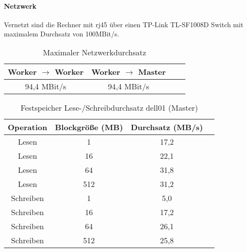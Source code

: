 \paragraph{Netzwerk}
Vernetzt sind die Rechner mit \gls{rj45} über einen TP-Link TL-SF1008D Switch mit maximalem Durchsatz von 100MBit/s.

\begin{table}[ht]
	\centering %
	\begin{tabular}{c c c c} %
	\hline\hline %
	Worker $\rightarrow$ Worker & Worker $\rightarrow$ Master \\ [0.5ex] %
	\hline %
	94,4 MBit/s & 94,4 MBit/s\\ [1ex] 
	\hline %
	\end{tabular}
	\caption{Maximaler Netzwerkdurchsatz{\protect\footnotemark}} %
	\label{table:network} %
\end{table}

\begin{table}[ht]
	\centering %
	\begin{tabular}{c c c c} %
	\hline\hline %
	Operation & Blockgröße (MB) & Durchsatz (MB/s) \\ [0.5ex] %
	\hline %
	Lesen & 1 & 17,2 \\ 
	Lesen & 16 & 22,1 \\
	Lesen & 64 & 31,8 \\
	Lesen & 512 & 31,2 \\
	Schreiben & 1 & 5,0 \\
	Schreiben & 16 & 17,2 \\
	Schreiben & 64 & 26,1 \\
	Schreiben & 512 & 25,8 \\[1ex] 
	\hline %
	\end{tabular}
	\caption{Festspeicher Lese-/Schreibdurchsatz dell01 (Master){\protect\footnotemark}} %
	\label{table:master_harddrive} %
\end{table}

